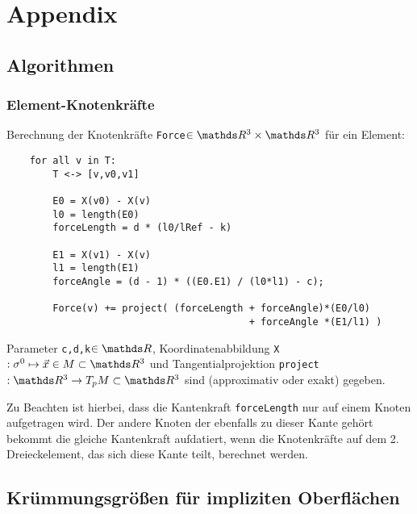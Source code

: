 \newcommand{\trace}{\text{Trace}}


\chapter{Appendix}

\section{Algorithmen}
  
  
  \subsection{Element-Knotenkräfte}
    \label{AlgoForces}
    Berechnung der Knotenkräfte \texttt{Force}\( \in\R^{3}\times\R^{3} \) für ein Element:

    \begin{verbatim}
    for all v in T:
        T <-> [v,v0,v1]
        
        E0 = X(v0) - X(v)
        l0 = length(E0)
        forceLength = d * (l0/lRef - k)

        E1 = X(v1) - X(v)
        l1 = length(E1)
        forceAngle = (d - 1) * ((E0.E1) / (l0*l1) - c);

        Force(v) += project( (forceLength + forceAngle)*(E0/l0) 
                                          + forceAngle *(E1/l1) ) 
    \end{verbatim}

    Parameter \texttt{c,d,k}\( \in\R \), 
    Koordinatenabbildung \texttt{X}\(: \sigma^{0} \mapsto \vec{x}\in M \subset \R^{3} \) 
    und Tangentialprojektion \texttt{project}\(: \R^{3} \rightarrow T_{p}M \subset \R^{3} \)
    sind (approximativ oder exakt) gegeben.

    Zu Beachten ist hierbei, dass die Kantenkraft \texttt{forceLength} nur auf einem Knoten aufgetragen wird.
    Der andere Knoten der ebenfalls zu dieser Kante gehört bekommt die gleiche Kantenkraft aufdatiert, wenn die Knotenkräfte auf dem 2. Dreieckelement, das sich diese Kante teilt, berechnet
    werden.

\section{Krümmungsgrößen für impliziten Oberflächen}

